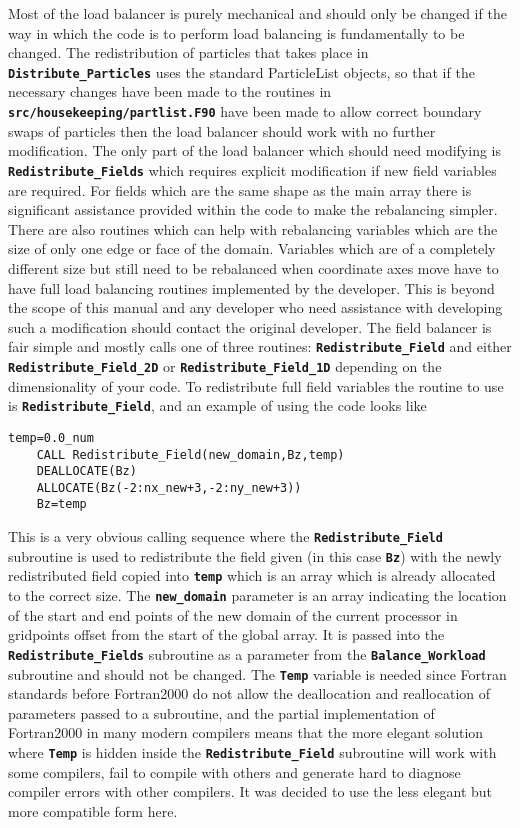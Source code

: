 \documentclass[12pt]{article}
\newcommand{\simpleboxverbatim}{\begin{Verbatim}[obeytabs=true,frame=single,
  framerule=0.5mm,rulecolor=\color{warwickmid}]}
\newcommand{\inlinecode}[1]{{\color{warwickred} \bf\texttt{#1}}}
\begin{document}
Most of the load balancer is purely mechanical and should only be changed if
the way in which the code is to perform load balancing is fundamentally to be
changed. The redistribution of particles that takes place in
\inlinecode{Distribute\_Particles} uses the standard ParticleList objects, so
that if the necessary changes have been made to the routines in
\inlinecode{src/housekeeping/partlist.F90} have been made to allow correct
boundary swaps of particles then the load balancer should work with no further
modification. The only part of the load balancer which should need modifying is
\inlinecode{Redistribute\_Fields} which requires explicit modification if new
field variables are required. For fields which are the same shape as the main
array there is significant assistance provided within the code to make the
rebalancing simpler. There are also routines which can help with rebalancing
variables which are the size of only one edge or face of the domain. Variables
which are of a completely different size but still need to be rebalanced when
coordinate axes move have to have full load balancing routines implemented by
the developer. This is beyond the scope of this manual and any developer who
need assistance with developing such a modification should contact the original
developer. The field balancer is fair simple and mostly calls one of three
routines: \inlinecode{Redistribute\_Field} and either
\inlinecode{Redistribute\_Field\_2D} or \inlinecode{Redistribute\_Field\_1D}
depending on the dimensionality of your code. To redistribute full field
variables the routine to use is \inlinecode{Redistribute\_Field}, and an
example of using the code looks like

\simpleboxverbatim
    temp=0.0_num
    CALL Redistribute_Field(new_domain,Bz,temp)
    DEALLOCATE(Bz)
    ALLOCATE(Bz(-2:nx_new+3,-2:ny_new+3))
    Bz=temp
\end{Verbatim}

This is a very obvious calling sequence where the
\inlinecode{Redistribute\_Field} subroutine is used to redistribute the field
given (in this case \inlinecode{Bz}) with the newly redistributed field copied
into \inlinecode{temp} which is an array which is already allocated to the
correct size. The \inlinecode{new\_domain} parameter is an array indicating the
location of the start and end points of the new domain of the current processor
in gridpoints offset from the start of the global array. It is passed into the
\inlinecode{Redistribute\_Fields} subroutine as a parameter from the
\inlinecode{Balance\_Workload} subroutine and should not be changed. The
\inlinecode{Temp} variable is needed since Fortran standards before Fortran2000
do not allow the deallocation and reallocation of parameters passed to a
subroutine, and the partial implementation of Fortran2000 in many modern
compilers means that the more elegant solution where \inlinecode{Temp} is
hidden inside the \inlinecode{Redistribute\_Field} subroutine will work with
some compilers, fail to compile with others and generate hard to diagnose
compiler errors with other compilers. It was decided to use the less elegant
but more compatible form here.\\
\end{document}

